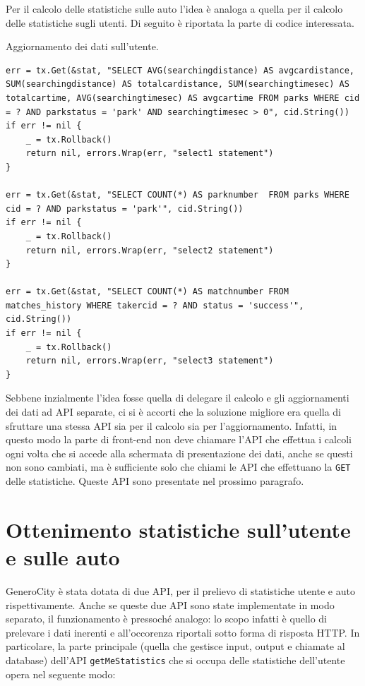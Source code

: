 \documentclass[italian, Lau, oneside, nodefaultfont, noexaminfo]{sapthesis}
\begin{document}
Per il calcolo delle statistiche sulle auto l'idea è analoga a quella per il calcolo delle statistiche sugli utenti. Di seguito è riportata  la parte di codice interessata.

\begin{listing}[H]
\caption{Aggiornamento dei dati sull'utente.}
\begin{verbatim}
err = tx.Get(&stat, "SELECT AVG(searchingdistance) AS avgcardistance, SUM(searchingdistance) AS totalcardistance, SUM(searchingtimesec) AS totalcartime, AVG(searchingtimesec) AS avgcartime FROM parks WHERE cid = ? AND parkstatus = 'park' AND searchingtimesec > 0", cid.String())
if err != nil {
	_ = tx.Rollback()
	return nil, errors.Wrap(err, "select1 statement")
}

err = tx.Get(&stat, "SELECT COUNT(*) AS parknumber  FROM parks WHERE cid = ? AND parkstatus = 'park'", cid.String())
if err != nil {
	_ = tx.Rollback()
	return nil, errors.Wrap(err, "select2 statement")
}

err = tx.Get(&stat, "SELECT COUNT(*) AS matchnumber FROM matches_history WHERE takercid = ? AND status = 'success'", cid.String())
if err != nil {
	_ = tx.Rollback()
	return nil, errors.Wrap(err, "select3 statement")
}
\end{verbatim}
\end{listing}




Sebbene inzialmente l'idea fosse quella di delegare il calcolo e gli aggiornamenti dei dati ad API separate, ci si è accorti che la soluzione migliore era quella di sfruttare una stessa API sia  per il calcolo sia per l'aggiornamento. Infatti, in questo modo la parte di front-end non deve chiamare l'API che effettua i calcoli ogni volta che si accede alla schermata di presentazione dei dati, anche se questi non sono cambiati, ma è sufficiente solo che chiami le API che effettuano la \texttt{GET} delle statistiche.  Queste API sono  presentate nel prossimo paragrafo.


\section{Ottenimento statistiche sull'utente e sulle auto}

GeneroCity è stata dotata di due API,  per il prelievo di statistiche utente e auto rispettivamente.
Anche se queste due API sono state implementate in modo separato, il funzionamento è pressoché analogo:  lo scopo infatti è quello di prelevare i dati inerenti  e all'occorenza riportali sotto forma di risposta HTTP. In particolare, la parte principale (quella che gestisce input, output e chiamate al database) dell'API \texttt{getMeStatistics} che si occupa delle statistiche dell'utente opera nel seguente modo: 
\end{document}
